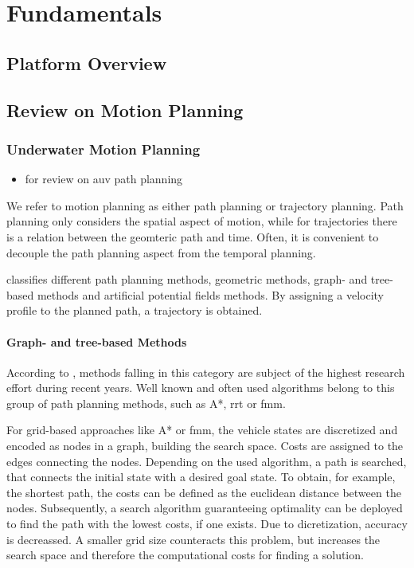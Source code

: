 \chapter{Fundamentals}

\section{Platform Overview}

\section{Review on Motion Planning}
\label{sec:review-motion-planning}
\subsection{Underwater Motion Planning}
\begin{itemize}
    \color{red}
    \item \cite{Panda20} for review on auv path planning
\end{itemize}
\label{sec:underwater-motion-planning}
We refer to motion planning as either path planning or trajectory planning. Path planning only considers the spatial aspect of motion, while for trajectories there is a relation between the geomteric path and time. Often, it is convenient to decouple the path planning aspect from the temporal planning.

\cite{Gomez15} classifies different path planning methods, geometric methods, graph- and tree-based methods and artificial potential fields methods. By assigning a velocity profile to the planned path, a trajectory is obtained.

\subsubsection{Graph- and tree-based Methods}
According to \cite{Gomez15}, methods falling in this category are subject of the highest research effort during recent years. Well known and often used algorithms belong to this group of path planning methods, such as A*, \ac{rrt} or \ac{fmm}.

For grid-based approaches like A* or \ac{fmm}, the vehicle states are discretized and encoded as nodes in a graph, building the search space. Costs are assigned to the edges connecting the nodes. Depending on the used algorithm, a path is searched, that connects the initial state with a desired goal state.
To obtain, for example, the shortest path, the costs can be defined as the euclidean distance between the nodes.
Subsequently, a search algorithm guaranteeing optimality can be deployed to find the path with the lowest costs, if one exists. Due to dicretization, accuracy is decreassed. A smaller grid size counteracts this problem, but increases the search space and therefore the computational costs for finding a solution.

